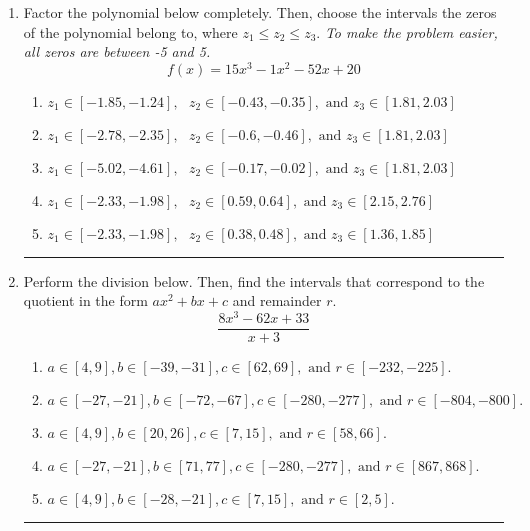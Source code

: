 \documentclass[14pt]{extbook}
\newcommand{\litem}[1]{\item#1\hspace*{-1cm}\rule{\textwidth}{0.4pt}}
\begin{document}
\begin{enumerate}
{\begin{enumerate}[label=\Alph*.]
\end{enumerate} }
\litem{
Factor the polynomial below completely. Then, choose the intervals the zeros of the polynomial belong to, where $z_1 \leq z_2 \leq z_3$. \textit{To make the problem easier, all zeros are between -5 and 5.}\[ f(x) = 15x^{3} -1 x^{2} -52 x + 20 \]\begin{enumerate}[label=\Alph*.]
\item \( z_1 \in [-1.85, -1.24], \text{   }  z_2 \in [-0.43, -0.35], \text{   and   } z_3 \in [1.81, 2.03] \)
\item \( z_1 \in [-2.78, -2.35], \text{   }  z_2 \in [-0.6, -0.46], \text{   and   } z_3 \in [1.81, 2.03] \)
\item \( z_1 \in [-5.02, -4.61], \text{   }  z_2 \in [-0.17, -0.02], \text{   and   } z_3 \in [1.81, 2.03] \)
\item \( z_1 \in [-2.33, -1.98], \text{   }  z_2 \in [0.59, 0.64], \text{   and   } z_3 \in [2.15, 2.76] \)
\item \( z_1 \in [-2.33, -1.98], \text{   }  z_2 \in [0.38, 0.48], \text{   and   } z_3 \in [1.36, 1.85] \)

\end{enumerate} }
\litem{
Perform the division below. Then, find the intervals that correspond to the quotient in the form $ax^2+bx+c$ and remainder $r$.\[ \frac{8x^{3} -62 x + 33}{x + 3} \]\begin{enumerate}[label=\Alph*.]
\item \( a \in [4, 9], b \in [-39, -31], c \in [62, 69], \text{ and } r \in [-232, -225]. \)
\item \( a \in [-27, -21], b \in [-72, -67], c \in [-280, -277], \text{ and } r \in [-804, -800]. \)
\item \( a \in [4, 9], b \in [20, 26], c \in [7, 15], \text{ and } r \in [58, 66]. \)
\item \( a \in [-27, -21], b \in [71, 77], c \in [-280, -277], \text{ and } r \in [867, 868]. \)
\item \( a \in [4, 9], b \in [-28, -21], c \in [7, 15], \text{ and } r \in [2, 5]. \)


\end{enumerate}}
\end{enumerate}
\end{document}
